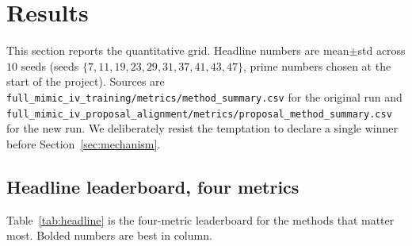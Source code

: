 \section{Results}
\label{sec:results}

This section reports the quantitative grid. Headline numbers are mean$\pm$std
across $10$ seeds (seeds $\{7, 11, 19, 23, 29, 31, 37, 41, 43, 47\}$, prime
numbers chosen at the start of the project). Sources are
\texttt{full\_mimic\_iv\_training/metrics/method\_summary.csv} for the original
run and \texttt{full\_mimic\_iv\_proposal\_alignment/metrics/proposal\_method\_summary.csv}
for the new run. We deliberately resist the temptation to declare a single
winner before Section~\ref{sec:mechanism}.

\subsection{Headline leaderboard, four metrics}
Table~\ref{tab:headline} is the four-metric leaderboard for the methods that
matter most. Bolded numbers are best in column.

